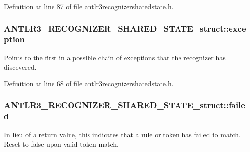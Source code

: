 Definition at line 87 of file antlr3recognizersharedstate.\-h.

\hypertarget{struct_a_n_t_l_r3___r_e_c_o_g_n_i_z_e_r___s_h_a_r_e_d___s_t_a_t_e__struct_ad1cf97a94bd235db56fddaf3294e5bc5}{
\subsubsection[{exception}]{ A\-N\-T\-L\-R3\-\_\-\-R\-E\-C\-O\-G\-N\-I\-Z\-E\-R\-\_\-\-S\-H\-A\-R\-E\-D\-\_\-\-S\-T\-A\-T\-E\-\_\-struct\-::exception}}\label{struct_a_n_t_l_r3___r_e_c_o_g_n_i_z_e_r___s_h_a_r_e_d___s_t_a_t_e__struct_ad1cf97a94bd235db56fddaf3294e5bc5}
Points to the first in a possible chain of exceptions that the recognizer has discovered. 

Definition at line 68 of file antlr3recognizersharedstate.\-h.

\hypertarget{struct_a_n_t_l_r3___r_e_c_o_g_n_i_z_e_r___s_h_a_r_e_d___s_t_a_t_e__struct_a27b7db600ef34d48b62eb0975cb0eb10}{
\subsubsection[{failed}]{ A\-N\-T\-L\-R3\-\_\-\-R\-E\-C\-O\-G\-N\-I\-Z\-E\-R\-\_\-\-S\-H\-A\-R\-E\-D\-\_\-\-S\-T\-A\-T\-E\-\_\-struct\-::failed}}\label{struct_a_n_t_l_r3___r_e_c_o_g_n_i_z_e_r___s_h_a_r_e_d___s_t_a_t_e__struct_a27b7db600ef34d48b62eb0975cb0eb10}
In lieu of a return value, this indicates that a rule or token has failed to match. Reset to false upon valid token match. 

